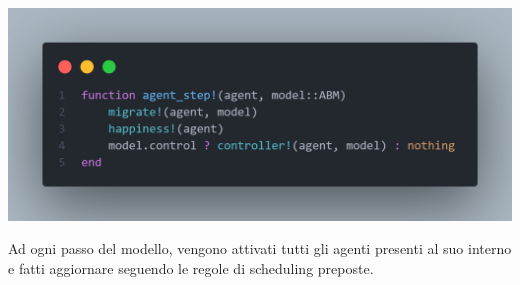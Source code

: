 \begin{minipage}{\linewidth}
	\centering
	\includegraphics[width=\textwidth]{img/agent_behaviour.png}
	\label{fig:agent_behaviour}
\end{minipage}

Ad ogni passo del modello, vengono attivati tutti gli agenti presenti al suo interno e 
fatti aggiornare seguendo le regole di scheduling preposte. 

